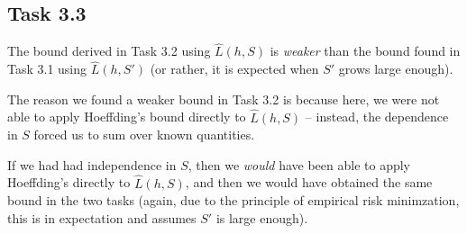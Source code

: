 \subsection{Task 3.3}

The bound derived in Task 3.2 using $\hat L(h, S)$ is \textit{weaker} than the
bound found in Task 3.1 using $\hat L(h, S')$ (or rather, it is expected when
$S'$ grows large enough).

The reason we found a weaker bound in Task 3.2 is because here, we were not able
to apply Hoeffding's bound directly to $\hat L(h, S)$ -- instead, the dependence
in $S$ forced us to sum over known quantities.

If we had had independence in $S$, then we \textit{would} have been able to
apply Hoeffding's directly to $\hat L(h, S)$, and then we would have obtained
the same bound in the two tasks (again, due to the principle of empirical risk
minimzation, this is in expectation and assumes $S'$ is large enough).

\sectend
